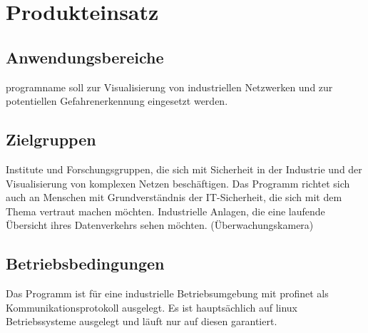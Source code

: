 \chapter{Produkteinsatz}

\section{Anwendungsbereiche}
\gls{programname} soll zur Visualisierung von industriellen Netzwerken und zur potentiellen Gefahrenerkennung eingesetzt werden.

\section{Zielgruppen}
Institute und Forschungsgruppen, die sich mit Sicherheit in der Industrie und der Visualisierung von komplexen Netzen beschäftigen. Das Programm richtet sich auch an Menschen mit Grundverständnis der IT-Sicherheit, die sich mit dem Thema vertraut machen möchten.\newline\newline
Industrielle Anlagen, die eine laufende Übersicht ihres Datenverkehrs sehen möchten. (Überwachungskamera)

\section{Betriebsbedingungen}
Das Programm ist für eine industrielle Betriebsumgebung mit \gls{profinet} als Kommunikationsprotokoll ausgelegt. Es ist hauptsächlich auf \gls{linux} Betriebssysteme ausgelegt und läuft nur auf diesen garantiert.

